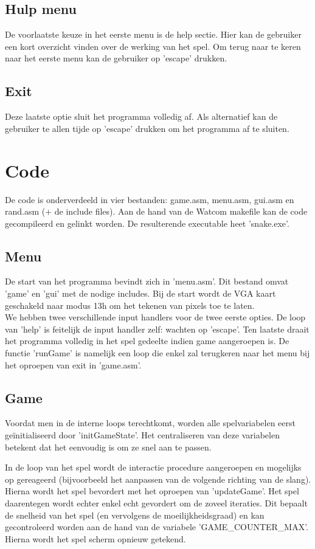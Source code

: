 \documentclass[11pt,a4paper]{article}
\begin{document}
\subsection{Hulp menu}
De voorlaatste keuze in het eerste menu is de help sectie. Hier kan de gebruiker een kort overzicht vinden over de werking van het spel. Om terug naar te keren naar het eerste menu kan de gebruiker op 'escape' drukken.

\subsection{Exit}
Deze laatste optie sluit het programma volledig af. Als alternatief kan de gebruiker te allen tijde op 'escape' drukken om het programma af te sluiten.

\newpage

\section{Code}
De code is onderverdeeld in vier bestanden: game.asm, menu.asm, gui.asm en rand.asm (+ de include files). Aan de hand van de Watcom makefile kan de code gecompileerd en gelinkt worden. De resulterende executable heet 'snake.exe'.

\subsection{Menu}
De start van het programma bevindt zich in 'menu.asm'. Dit bestand omvat 'game' en 'gui' met de nodige includes. Bij de start wordt de VGA kaart geschakeld naar modus 13h om het tekenen van pixels toe te laten.\\
We hebben twee verschillende input handlers voor de twee eerste opties. De loop van 'help' is feitelijk de input handler zelf: wachten op 'escape'. Ten laatste draait het programma volledig in het spel gedeelte indien game aangeroepen is. De functie 'runGame' is namelijk een loop die enkel zal terugkeren naar het menu bij het oproepen van exit in 'game.asm'.

\subsection{Game}
Voordat men in de interne loops terechtkomt, worden alle spelvariabelen eerst geïnitialiseerd door 'initGameState'. Het centraliseren van deze variabelen betekent dat het eenvoudig is om ze snel aan te passen.

In de loop van het spel wordt de interactie procedure aangeroepen en mogelijks op gereageerd (bijvoorbeeld het aanpassen van de volgende richting van de slang). Hierna wordt het spel bevordert met het oproepen van 'updateGame'. Het spel daarentegen wordt echter enkel echt gevordert om de zoveel iteraties. Dit bepaalt de snelheid van het spel (en vervolgens de moeilijkheidsgraad) en kan gecontroleerd worden aan de hand van de variabele 'GAME\_COUNTER\_MAX'. Hierna wordt het spel scherm opnieuw getekend. 
\end{document}
